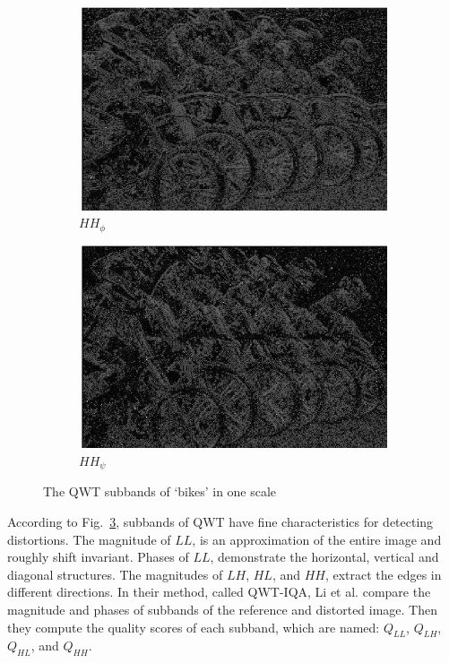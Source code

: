 \begin{figure}
\begin{subfigure}[b]{0.23\textwidth}
         \includegraphics[width=\textwidth]{./figs/o_2_2_2_q}
         \caption{$HH_{\phi}$}
         \label{fig:qwt15}
     \end{subfigure}
     \begin{subfigure}[b]{0.23\textwidth}
         \centering
         \includegraphics[width=\textwidth]{./figs/o_2_2_3_q}
         \caption{$HH_{\psi}$}
         \label{fig:qwt16}
     \end{subfigure}
        \caption{The QWT subbands of `bikes' in one scale}
        \label{fig:qwt}
\end{figure}
According to Fig.~\ref{fig:qwt}, subbands of QWT have fine characteristics for detecting distortions. The magnitude of $LL$, is an approximation of the entire image and roughly shift invariant. Phases of $LL$, demonstrate the horizontal, vertical and diagonal structures. The magnitudes of $LH$, $HL$, and $HH$, extract the edges in different directions. In their method, called QWT-IQA, Li et al. compare the magnitude and phases of subbands of the reference and distorted image. Then they compute the quality scores of each subband, which are named: $Q_{LL}$, $Q_{LH}$, $Q_{HL}$, and $Q_{HH}$.

